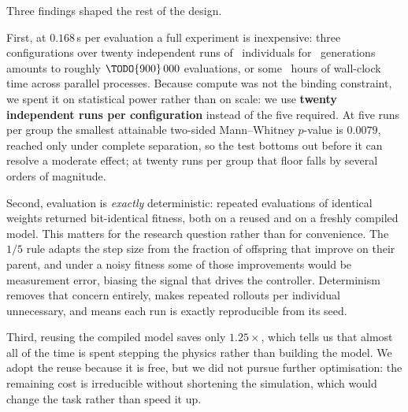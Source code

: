 Three findings shaped the rest of the design.

First, at $0.168$\,s per evaluation a full experiment is inexpensive:
three configurations over twenty independent runs of
~individuals for ~generations amounts to roughly
$\TODO{900}\,000$ evaluations, or some ~hours of wall-clock time
across  parallel processes. Because compute was not the binding
constraint, we spent it on statistical power rather than on scale: we use
\textbf{twenty independent runs per configuration} instead of the five
required. At five runs per group the smallest attainable two-sided
Mann--Whitney $p$-value is $0.0079$, reached only under complete
separation, so the test bottoms out before it can resolve a moderate
effect; at twenty runs per group that floor falls by several orders of
magnitude.

Second, evaluation is \emph{exactly} deterministic: repeated evaluations
of identical weights returned bit-identical fitness, both on a reused and
on a freshly compiled model. This matters for the research question
rather than for convenience. The $1/5$ rule adapts the step size from the
fraction of offspring that improve on their parent, and under a noisy
fitness some of those improvements would be measurement error, biasing
the signal that drives the controller. Determinism removes that concern
entirely, makes repeated rollouts per individual unnecessary, and means
each run is exactly reproducible from its seed.

Third, reusing the compiled model saves only $1.25\times$, which tells us
that almost all of the time is spent stepping the physics rather than
building the model. We adopt the reuse because it is free, but we did not
pursue further optimisation: the remaining cost is irreducible without
shortening the simulation, which would change the task rather than speed
it up.
